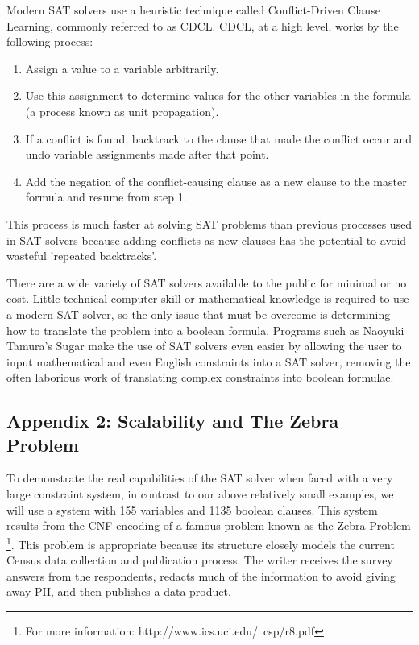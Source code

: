 \documentclass[jou,apacite]{apa6}
\begin{document}
Modern SAT solvers use a heuristic technique called Conflict-Driven Clause Learning, commonly referred to as CDCL. CDCL, at a high level, works by the following process:

\begin{enumerate}

\item Assign a value to a variable arbitrarily.
\item Use this assignment to determine values for the other variables in the formula (a process known as unit propagation).
\item If a conflict is found, backtrack to the clause that made the conflict occur and undo variable assignments made after that point.
\item Add the negation of the conflict-causing clause as a new clause to the master formula and resume from step 1.

\end{enumerate}

This process is much faster at solving SAT problems than previous processes used in SAT solvers because adding conflicts as new clauses has the potential to avoid wasteful 'repeated backtracks'.

There are a wide variety of SAT solvers available to the public for minimal or no cost. Little technical computer skill or mathematical knowledge is required to use a modern SAT solver, so the only issue that must be overcome is determining how to translate the problem into a boolean formula. Programs such as Naoyuki Tamura's Sugar make the use of SAT solvers even easier by allowing the user to input mathematical and even English constraints into a SAT solver, removing the often laborious work of translating complex constraints into boolean formulae.

\subsection{Appendix 2: Scalability and The Zebra Problem}

To demonstrate the real capabilities of the SAT solver when faced with a very large constraint system, in contrast to our above relatively small examples, we will use a system with 155 variables and 1135 boolean clauses. This system results from the CNF encoding of a famous problem known as the Zebra Problem \footnote{For more information: http://www.ics.uci.edu/~csp/r8.pdf}.
This problem is appropriate because its structure closely models the current Census data collection and publication process. The writer receives the survey answers from the respondents, redacts much of the information to avoid giving away PII, and then publishes a data product.
\end{document}
